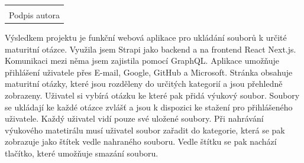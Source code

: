 \documentclass[12pt, a4paper,
oneside,      %
openright
]{report}
\newcommand\datumOdevzdani{1. 1. 2024} %
\begin{document}
\clearpage %
	
	
	\vspace*{0.7\textheight} %

	\vfill
	\noindent{V Opavě \datumOdevzdani\\}
	\noindent
	\begin{minipage}{\linewidth}
		\hspace{9.5cm} 
		\begin{tabular}{@{}p{6cm}@{}}
			\dotfill \\
			Podpis autora
		\end{tabular}
	\end{minipage}
	
	\clearpage %


	Výsledkem projektu je funkční webová aplikace pro ukládání souborů k určité maturitní otázce. Využila jsem Strapi jako backend a na frontend React Next.js. Komunikaci mezi něma jsem zajistila pomocí GraphQL. Aplikace umožňuje přihlášení uživatele přes E-mail, Google, GitHub a Microsoft. Stránka obsahuje maturitní otázky, které jsou rozděleny do určitých kategorií a jsou přehledně zobrazeny. Uživatel si vybírá otázku ke které pak přidá výukový soubor. Soubory se ukládají ke každé otázce zvlášť a jsou k dispozici ke stažení pro přihlášeného uživatele. Každý uživatel vidí pouze své uložené soubory. Při nahrávání výukového matetirálu musí uživatel soubor zařadit do kategorie, která se pak zobrazuje jako štítek vedle nahraného souboru. Vedle štítku se pak nachází tlačítko, které umožňuje smazání souboru.
	\\
	
\end{document}
